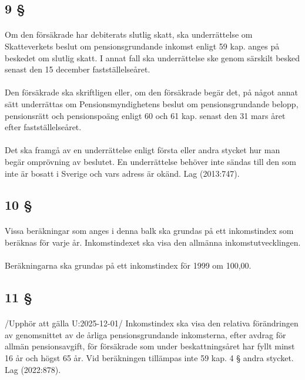 \documentclass[a4paper,notitlepage,openany,10pt]{book}
\begin{document}
\subsection*{9 §}
\paragraph*{}
Om den försäkrade har debiterats slutlig skatt, ska underrättelse om Skatteverkets beslut om pensionsgrundande inkomst enligt 59 kap. anges på beskedet om slutlig skatt. I annat fall ska underrättelse ske genom särskilt besked senast den 15 december fastställelseåret.
\paragraph*{}
Den försäkrade ska skriftligen eller, om den försäkrade begär det, på något annat sätt underrättas om Pensionsmyndighetens beslut om pensionsgrundande belopp, pensionsrätt och pensionspoäng enligt 60 och 61 kap. senast den 31 mars året efter fastställelseåret.
\paragraph*{}
Det ska framgå av en underrättelse enligt första eller andra stycket hur man begär omprövning av beslutet. En underrättelse behöver inte sändas till den som inte är bosatt i Sverige och vars adress är okänd.
Lag (2013:747).
\subsection*{10 §}
\paragraph*{}
Vissa beräkningar som anges i denna balk ska grundas på ett inkomstindex som beräknas för varje år. Inkomstindexet ska visa den allmänna inkomstutvecklingen.
\paragraph*{}
Beräkningarna ska grundas på ett inkomstindex för 1999 om 100,00.
\subsection*{11 §}
\paragraph*{}
/Upphör att gälla U:2025-12-01/
Inkomstindex ska visa den relativa förändringen av genomsnittet av de årliga pensionsgrundande inkomsterna, efter avdrag för allmän pensionsavgift, för försäkrade som under beskattningsåret har fyllt minst 16 år och högst 65 år. Vid beräkningen tillämpas inte 59 kap. 4 § andra stycket.
Lag (2022:878).
\end{document}
